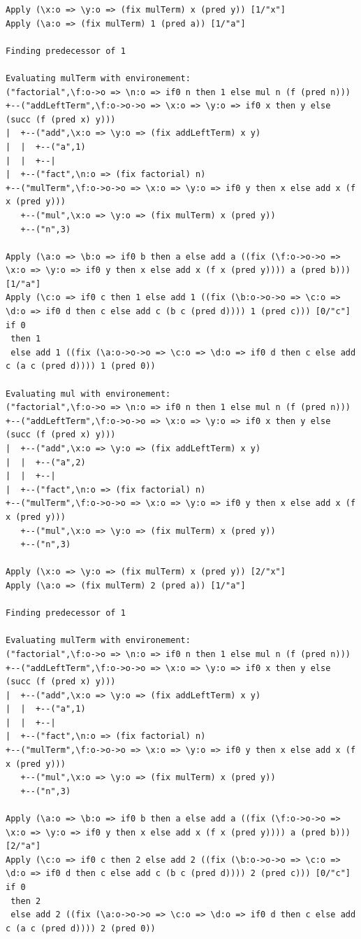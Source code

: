 \documentclass[12pt,a4paper]{report}
\theoremstyle{definition}
\theoremstyle{definition}
\theoremstyle{remark}
\begin{document}
\begin{verbatim}
Apply (\x:o => \y:o => (fix mulTerm) x (pred y)) [1/"x"] 
Apply (\a:o => (fix mulTerm) 1 (pred a)) [1/"a"] 

Finding predecessor of 1

Evaluating mulTerm with environement:
("factorial",\f:o->o => \n:o => if0 n then 1 else mul n (f (pred n)))
+--("addLeftTerm",\f:o->o->o => \x:o => \y:o => if0 x then y else (succ (f (pred x) y)))
|  +--("add",\x:o => \y:o => (fix addLeftTerm) x y)
|  |  +--("a",1)
|  |  +--|
|  +--("fact",\n:o => (fix factorial) n)
+--("mulTerm",\f:o->o->o => \x:o => \y:o => if0 y then x else add x (f x (pred y)))
   +--("mul",\x:o => \y:o => (fix mulTerm) x (pred y))
   +--("n",3)

Apply (\a:o => \b:o => if0 b then a else add a ((fix (\f:o->o->o => \x:o => \y:o => if0 y then x else add x (f x (pred y)))) a (pred b))) [1/"a"] 
Apply (\c:o => if0 c then 1 else add 1 ((fix (\b:o->o->o => \c:o => \d:o => if0 d then c else add c (b c (pred d)))) 1 (pred c))) [0/"c"] 
if 0
 then 1
 else add 1 ((fix (\a:o->o->o => \c:o => \d:o => if0 d then c else add c (a c (pred d)))) 1 (pred 0))

Evaluating mul with environement:
("factorial",\f:o->o => \n:o => if0 n then 1 else mul n (f (pred n)))
+--("addLeftTerm",\f:o->o->o => \x:o => \y:o => if0 x then y else (succ (f (pred x) y)))
|  +--("add",\x:o => \y:o => (fix addLeftTerm) x y)
|  |  +--("a",2)
|  |  +--|
|  +--("fact",\n:o => (fix factorial) n)
+--("mulTerm",\f:o->o->o => \x:o => \y:o => if0 y then x else add x (f x (pred y)))
   +--("mul",\x:o => \y:o => (fix mulTerm) x (pred y))
   +--("n",3)

Apply (\x:o => \y:o => (fix mulTerm) x (pred y)) [2/"x"] 
Apply (\a:o => (fix mulTerm) 2 (pred a)) [1/"a"] 

Finding predecessor of 1

Evaluating mulTerm with environement:
("factorial",\f:o->o => \n:o => if0 n then 1 else mul n (f (pred n)))
+--("addLeftTerm",\f:o->o->o => \x:o => \y:o => if0 x then y else (succ (f (pred x) y)))
|  +--("add",\x:o => \y:o => (fix addLeftTerm) x y)
|  |  +--("a",1)
|  |  +--|
|  +--("fact",\n:o => (fix factorial) n)
+--("mulTerm",\f:o->o->o => \x:o => \y:o => if0 y then x else add x (f x (pred y)))
   +--("mul",\x:o => \y:o => (fix mulTerm) x (pred y))
   +--("n",3)

Apply (\a:o => \b:o => if0 b then a else add a ((fix (\f:o->o->o => \x:o => \y:o => if0 y then x else add x (f x (pred y)))) a (pred b))) [2/"a"] 
Apply (\c:o => if0 c then 2 else add 2 ((fix (\b:o->o->o => \c:o => \d:o => if0 d then c else add c (b c (pred d)))) 2 (pred c))) [0/"c"] 
if 0
 then 2
 else add 2 ((fix (\a:o->o->o => \c:o => \d:o => if0 d then c else add c (a c (pred d)))) 2 (pred 0))


\end{verbatim}
\end{document}
